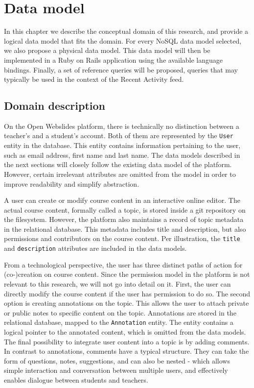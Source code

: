\chapter{Data model}
\label{ch:data-model}

In this chapter we describe the conceptual domain of this research, and provide a logical data model that fits the domain.
For every NoSQL data model selected, we also propose a physical data model.
This data model will then be implemented in a Ruby on Rails application using the available language bindings.
Finally, a set of reference queries will be proposed, queries that may typically be used in the context of the Recent Activity feed.

\section{Domain description}
\label{sec:domain-description}

On the Open Webslides platform, there is technically no distinction between a teacher's and a student's account.
Both of them are represented by the \texttt{User} entity in the database.
This entity contains information pertaining to the user, such as email address, first name and last name.
The data models described in the next sections will closely follow the existing data model of the platform.
However, certain irrelevant attributes are omitted from the model in order to improve readability and simplify abstraction.

A user can create or modify course content in an interactive online editor.
The actual course content, formally called a topic, is stored inside a git repository on the filesystem.
However, the platform also maintains a record of topic metadata in the relational database.
This metadata includes title and description, but also permissions and contributors on the course content.
Per illustration, the \texttt{title} and \texttt{description} attributes are included in the data models.

From a technological perspective, the user has three distinct paths of action for (co-)creation on course content.
Since the permission model in the platform is not relevant to this research, we will not go into detail on it.
First, the user can directly modify the course content if the user has permission to do so.
The second option is creating annotations on the topic.
This allows the user to attach private or public notes to specific content on the topic.
Annotations are stored in the relational database, mapped to the \texttt{Annotation} entity.
The entity contains a logical pointer to the annotated content, which is omitted from the data models.
The final possibility to integrate user content into a topic is by adding comments.
In contrast to annotations, comments have a typical structure.
They can take the form of questions, notes, suggestions, and can also be nested - which allows simple interaction and conversation between multiple users, and effectively enables dialogue between students and teachers.

